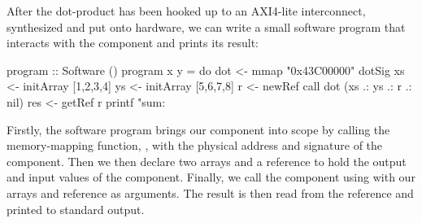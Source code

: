 \documentclass[../paper.tex]{subfiles}
\begin{document}
After the dot-product has been hooked up to an AXI4-lite interconnect, synthesized and put onto hardware, we can write a small software program that interacts with the component and prints its result:

\begin{code}
program :: Software ()
program x y = do
  dot <- mmap "0x43C00000" dotSig
  xs  <- initArray [1,2,3,4]
  ys  <- initArray [5,6,7,8]
  r   <- newRef
  call dot (xs .: ys .: r .: nil)
  res <- getRef r
  printf "sum: %
\end{code}

\noindent Firstly, the software program brings our component into scope by calling the memory-mapping function, , with the physical address and signature of the component. Then we then declare two arrays and a reference to hold the output and input values of the component. Finally, we call the component using  with our arrays and reference as arguments. The result is then read from the reference and printed to standard output.
\end{document}

